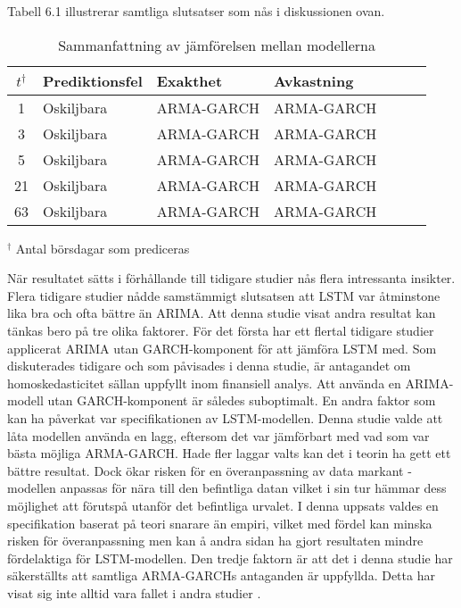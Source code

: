 \documentclass[11pt]{article}
\numberwithin{equation}{section}
\numberwithin{table}{section}
\numberwithin{figure}{section}
\begin{document}
Tabell 6.1 illustrerar samtliga slutsatser som nås i diskussionen ovan.


\begin{table}[H]
\caption{Sammanfattning av jämförelsen mellan modellerna}

\begin{tabularx}{\textwidth}{c *{6}{Y}}
\toprule
$t ^\dagger$  & Prediktionsfel & Exakthet & Avkastning \\
\hline

1      & Oskiljbara          & ARMA-GARCH                 & ARMA-GARCH          \\
3      & Oskiljbara          & ARMA-GARCH          & ARMA-GARCH    \\

5      & Oskiljbara          & ARMA-GARCH         &ARMA-GARCH   \\

21     &  Oskiljbara         & ARMA-GARCH         & ARMA-GARCH   \\


63     & Oskiljbara         & ARMA-GARCH         & ARMA-GARCH    \\ 

\bottomrule
\end{tabularx}
\footnotesize{$^\dagger$ Antal börsdagar som prediceras}
\end{table}

När resultatet sätts i förhållande till tidigare studier nås flera intressanta insikter. Flera tidigare studier nådde samstämmigt slutsatsen att LSTM var åtminstone lika bra och ofta bättre än ARIMA. Att denna studie visat andra resultat kan tänkas bero på tre olika faktorer. För det första har ett flertal tidigare studier applicerat ARIMA utan GARCH-komponent för att jämföra LSTM med. Som diskuterades tidigare och som påvisades i denna studie, är antagandet om homoskedasticitet sällan uppfyllt inom finansiell analys. Att använda en ARIMA-modell utan GARCH-komponent är således suboptimalt. En andra faktor som kan ha påverkat var specifikationen av LSTM-modellen. Denna studie valde att låta modellen använda en lagg, eftersom det var jämförbart med vad som var bästa möjliga ARMA-GARCH. Hade fler laggar valts kan det i teorin ha gett ett bättre resultat. Dock ökar risken för en överanpassning av data markant -  modellen anpassas för nära till den befintliga datan vilket i sin tur hämmar dess möjlighet att förutspå utanför det befintliga urvalet. I denna uppsats valdes en specifikation baserat på teori snarare än empiri, vilket med fördel kan minska risken för överanpassning men kan å andra sidan ha gjort resultaten mindre fördelaktiga för LSTM-modellen. Den tredje faktorn är att det i denna studie har säkerställts att samtliga ARMA-GARCHs antaganden är uppfyllda. Detta har visat sig inte alltid vara fallet i andra studier \parencite{paliwal2009neural}. 
\end{document}
